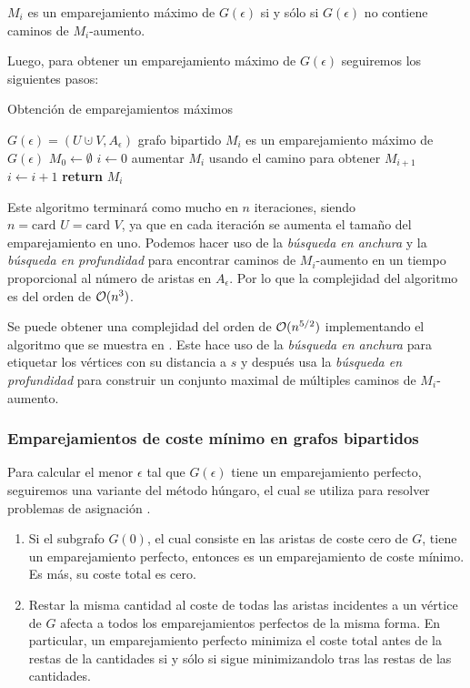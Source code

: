 \begin{lemma}
$M_i$ es un emparejamiento máximo de $G(\epsilon)$ si y sólo si $G(\epsilon)$ no contiene caminos de $M_i$-aumento.
\end{lemma}

Luego, para obtener un emparejamiento máximo de $G(\epsilon)$ seguiremos los siguientes pasos:

\begin{algorithm}[!ht]
\caption{Obtención de emparejamientos máximos}\label{ref:algEmpMax}
\begin{algorithmic}[1]
\Require $G(\epsilon)=(U \cupdot V, A_\epsilon)$ grafo bipartido
\Ensure $M_i$ es un emparejamiento máximo de $G(\epsilon)$
\State $M_0\gets \emptyset$
\State $i\gets 0$
	\State aumentar $M_i$ usando el camino para obtener $M_{i+1}$
	\State $i\gets i+1$
\EndWhile
\State \textbf{return} $M_i$
\end{algorithmic}
\end{algorithm}

Este algoritmo terminará como mucho en $n$ iteraciones, siendo $n= \text{card } U = \text{card } V$, ya que en cada iteración se aumenta el tamaño del emparejamiento en uno. Podemos hacer uso de la \emph{búsqueda en anchura} y la \emph{búsqueda en profundidad} para encontrar caminos de $M_i$-aumento en un tiempo proporcional al número de aristas en $A_\epsilon$. Por lo que la complejidad del algoritmo es del orden de $\mathcal{O}(n^3)$.

Se puede obtener una complejidad del orden de $\mathcal{O}(n^{5/2})$ implementando el algoritmo que se muestra en \cite{libroEH}. Este hace uso de la \emph{búsqueda en anchura} para etiquetar los vértices con su distancia a $s$ y después usa la \emph{búsqueda en profundidad} para construir un conjunto maximal de múltiples caminos de $M_i$-aumento.  

\subsubsection*{Emparejamientos de coste mínimo en grafos bipartidos}
Para calcular el menor $\epsilon$ tal que $G(\epsilon)$ tiene un emparejamiento perfecto, seguiremos una variante del método húngaro, el cual se utiliza para resolver problemas de asignación \cite{metodoHungaro}. 

\begin{property}
\leavevmode
\begin{enumerate}
	\item Si el subgrafo $G(0)$, el cual consiste en las aristas de coste cero de $G$, tiene un emparejamiento perfecto, entonces es un emparejamiento de coste mínimo. Es más, su coste total es cero.
	\item Restar la misma cantidad al coste de todas las aristas incidentes a un vértice de $G$ afecta a todos los emparejamientos perfectos de la misma forma. En particular, un emparejamiento perfecto minimiza el coste total antes de la restas de la cantidades si y sólo si sigue minimizandolo tras las restas de las cantidades.
\end{enumerate}
\end{property}

